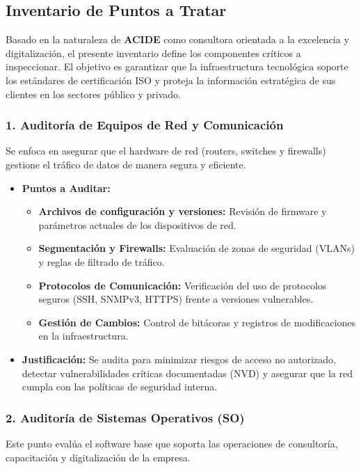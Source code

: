 \documentclass[12pt]{article}
\begin{document}
\subsection{Inventario de Puntos a Tratar}
Basado en la naturaleza de \textbf{ACIDE} como consultora orientada a la excelencia y digitalización, el presente inventario define los componentes críticos a inspeccionar. El objetivo es garantizar que la infraestructura tecnológica soporte los estándares de certificación ISO y proteja la información estratégica de sus clientes en los sectores público y privado.

\subsubsection{1. Auditoría de Equipos de Red y Comunicación}
Se enfoca en asegurar que el hardware de red (routers, switches y firewalls) gestione el tráfico de datos de manera segura y eficiente.

\begin{itemize}
    \item \textbf{Puntos a Auditar:}
    \begin{itemize}
        \item \textbf{Archivos de configuración y versiones:} Revisión de firmware y parámetros actuales de los dispositivos de red.
        \item \textbf{Segmentación y Firewalls:} Evaluación de zonas de seguridad (VLANs) y reglas de filtrado de tráfico.
        \item \textbf{Protocolos de Comunicación:} Verificación del uso de protocolos seguros (SSH, SNMPv3, HTTPS) frente a versiones vulnerables.
        \item \textbf{Gestión de Cambios:} Control de bitácoras y registros de modificaciones en la infraestructura.
    \end{itemize}
    \item \textbf{Justificación:} Se audita para minimizar riesgos de acceso no autorizado, detectar vulnerabilidades críticas documentadas (NVD) y asegurar que la red cumpla con las políticas de seguridad interna.
\end{itemize}

\subsubsection{2. Auditoría de Sistemas Operativos (SO)}
Este punto evalúa el software base que soporta las operaciones de consultoría, capacitación y digitalización de la empresa.
\end{document}
